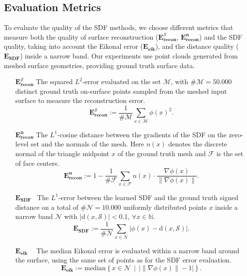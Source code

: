 \documentclass[12pt,openany]{book}
\theoremstyle{plainnormal}
\theoremstyle{remark}
\begin{document}
\subsection{Evaluation Metrics}
To evaluate the quality of the SDF methods, we choose different metrics that measure both the quality of surface reconstruction (\(\mathbf{E_{recon}^{\mathcal{S}}}\), $\mathbf{E_{recon}^n}$) and the SDF quality, taking into account the Eikonal error ($\mathbf{E_{eik}}$), and the distance quality ($\mathbf{E_{SDF}}$) inside a narrow band. Our experiments use point clouds generated from meshed surface geometries, providing ground truth surface data.
\begin{enumerate}[align=left]
\item[\(\mathbf{E_{recon}^{\mathcal{S}}}\)]  The squared $L^2$-error evaluated on the set $\mathcal M$, with $\#\mathcal M = 50.000$ distinct ground truth on-surface points sampled from the meshed input surface to measure the reconstruction error.
 $$\mathbf{E_{recon}^{\mathcal{S}}}:=\frac{1}{\# \mathcal{M} }\sum_{x \in \mathcal{M}} \phi(x)^2.$$
\item[$\mathbf{E_{recon}^n}$] The $L^1$-cosine distance between the gradients of the SDF on the zero-level set and the normals of the mesh. Here $n(x)$ denotes the discrete normal of the triangle midpoint $x$ of the ground truth mesh and $\mathcal{F}$ is the set of face centers. 
$$\mathbf{E_{recon}^n} :=1 - \frac{1}{\#\mathcal{F}} \sum_{x\in \mathcal{F}} n(x)\cdot\frac{\nabla  \phi(x)}{\|\nabla \phi(x)\|}. $$
\item[$\mathbf{E_{SDF}\;\:}$] The $L^1$-error between the learned SDF and the ground truth signed distance on a total of $\#\mathcal N = 10.000$ uniformly distributed points $x$ inside a narrow band $\mathcal{N}$ with $|\mathrm{d}(x, \mathcal{S})| < 0.1$, $\forall x\in \mathbb N$.
$$\mathbf{E_{SDF}} := \frac{1}{\#\mathcal{N}}\sum_{x\in \mathcal{N}}|\phi(x) - \mathrm{d}(x, \mathcal{S})|.$$%
\item[\(\mathbf{E_{\text{eik}}}\ \ \;\:\)] The median Eikonal error is evaluated within a narrow band around the surface, using the same set of points as for the SDF error evaluation.
 $$\mathbf{E_{eik}} := \mathrm{median} \left\{x\in \mathcal{N} \, \mid\,  \big|\|\nabla\phi(x)\| - 1\big|\right\}. $$
\end{enumerate}
\end{document}
